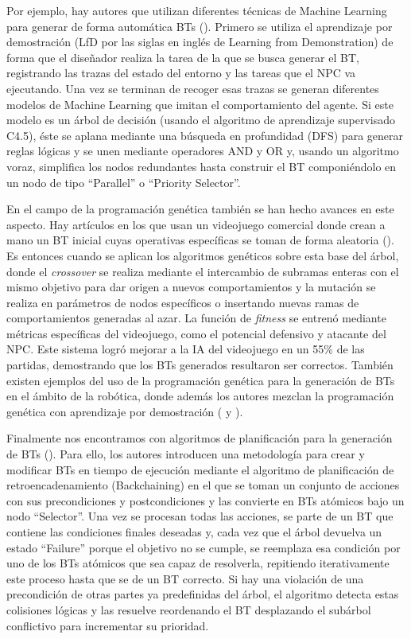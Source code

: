 Por ejemplo, hay autores que utilizan diferentes técnicas de Machine Learning para generar de forma automática BTs (\cite{IsmaBT}).
Primero se utiliza el aprendizaje por demostración (LfD por las siglas en inglés de Learning from Demonstration) de forma que el diseñador realiza la tarea de la que se busca generar el BT, registrando las trazas del estado del entorno y las tareas que el NPC va ejecutando.
Una vez se terminan de recoger esas trazas se generan diferentes modelos de Machine Learning que imitan el comportamiento del agente.
Si este modelo es un árbol de decisión (usando el algoritmo de aprendizaje supervisado C4.5), éste se aplana mediante una búsqueda en profundidad (DFS) para generar reglas lógicas y se unen mediante operadores AND y OR y, usando un algoritmo voraz, simplifica los nodos redundantes hasta construir el BT componiéndolo en un nodo de tipo ``Parallel'' o ``Priority Selector''.

En el campo de la programación genética también se han hecho avances en este aspecto.
Hay artículos en los que usan un videojuego comercial donde crean a mano un BT inicial cuyas operativas específicas se toman de forma aleatoria (\cite{DEFCON}).
Es entonces cuando se aplican los algoritmos genéticos sobre esta base del árbol, donde el \textit{crossover} se realiza mediante el intercambio de subramas enteras con el mismo objetivo para dar origen a nuevos comportamientos y la mutación se realiza en parámetros de nodos específicos o insertando nuevas ramas de comportamientos generadas al azar.
La función de \textit{fitness} se entrenó mediante métricas específicas del videojuego, como el potencial defensivo y atacante del NPC.
Este sistema logró mejorar a la IA del videojuego en un 55\% de las partidas, demostrando que los BTs generados resultaron ser correctos.
También existen ejemplos del uso de la programación genética para la generación de BTs en el ámbito de la robótica, donde además los autores mezclan la programación genética con aprendizaje por demostración (\cite{BTGen1} y \cite{BTGen2}).

Finalmente nos encontramos con algoritmos de planificación para la generación de BTs (\cite{BTPlan}).
Para ello, los autores introducen una metodología para crear y modificar BTs en tiempo de ejecución mediante el algoritmo de planificación de retroencadenamiento (Backchaining) en el que se toman un conjunto de acciones con sus precondiciones y postcondiciones y las convierte en BTs atómicos bajo un nodo ``Selector''.
Una vez se procesan todas las acciones, se parte de un BT que contiene las condiciones finales deseadas y, cada vez que el árbol devuelva un estado ``Failure'' porque el objetivo no se cumple, se reemplaza esa condición por uno de los BTs atómicos que sea capaz de resolverla, repitiendo iterativamente este proceso hasta que se de un BT correcto.
Si hay una violación de una precondición de otras partes ya predefinidas del árbol, el algoritmo detecta estas colisiones lógicas y las resuelve reordenando el BT desplazando el subárbol conflictivo para incrementar su prioridad.

